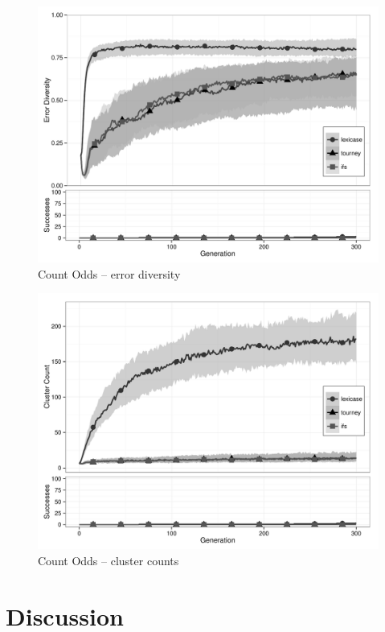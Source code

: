 \begin{figure}[p] %
\centering
\includegraphics[width=11.5cm]{count-odds-diversity.pdf}
\caption{Count Odds -- error diversity}
\label{count-oddsDiv}
\end{figure}

\begin{figure}[p] %
\centering
\includegraphics[width=11.5cm]{count-odds-cluster.pdf}
\caption{Count Odds -- cluster counts}
\label{count-oddsClu}
\end{figure}


\section{Discussion}
\label{sec:discussion}

